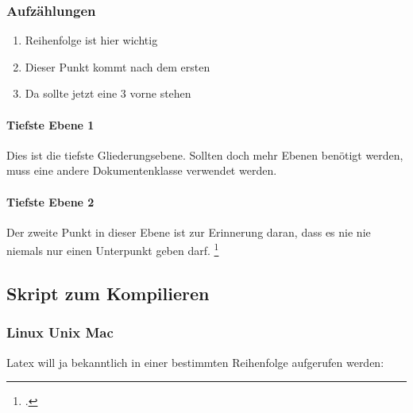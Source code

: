 \subsubsection{Aufzählungen}
\begin{enumerate}
\item Reihenfolge ist hier wichtig
\item Dieser Punkt kommt nach dem ersten
\item Da sollte jetzt eine 3 vorne stehen
\end{enumerate}

\paragraph{Tiefste Ebene 1}
Dies ist die tiefste Gliederungsebene. Sollten doch mehr Ebenen benötigt werden, muss eine andere Dokumentenklasse verwendet werden.

\paragraph{Tiefste Ebene 2}
Der zweite Punkt in dieser Ebene ist zur Erinnerung daran, dass es nie nie niemals nur einen Unterpunkt geben darf.
\footcite[Vgl. ]{website:andyGitHub:andysTemplate}


\subsection{Skript zum Kompilieren}
\subsubsection{Linux Unix Mac}
Latex will ja bekanntlich in einer bestimmten Reihenfolge aufgerufen werden:
